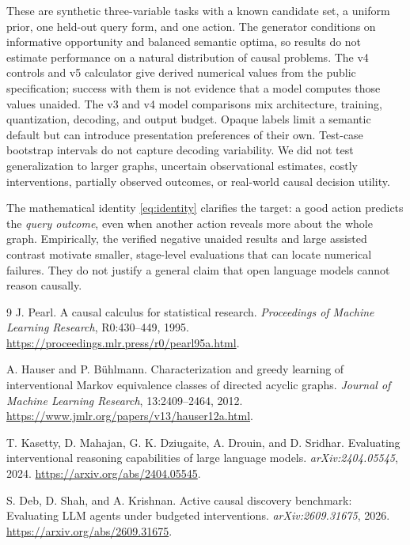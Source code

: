 \documentclass[10pt]{article}
\begin{document}
These are synthetic three-variable tasks with a known candidate set, a uniform prior, one held-out query form, and one action. The generator conditions on informative opportunity and balanced semantic optima, so results do not estimate performance on a natural distribution of causal problems. The v4 controls and v5 calculator give derived numerical values from the public specification; success with them is not evidence that a model computes those values unaided. The v3 and v4 model comparisons mix architecture, training, quantization, decoding, and output budget. Opaque labels limit a semantic default but can introduce presentation preferences of their own. Test-case bootstrap intervals do not capture decoding variability. We did not test generalization to larger graphs, uncertain observational estimates, costly interventions, partially observed outcomes, or real-world causal decision utility.

The mathematical identity \eqref{eq:identity} clarifies the target: a good action predicts the \emph{query outcome}, even when another action reveals more about the whole graph. Empirically, the verified negative unaided results and large assisted contrast motivate smaller, stage-level evaluations that can locate numerical failures. They do not justify a general claim that open language models cannot reason causally.

\begin{thebibliography}{9}
J. Pearl.
\newblock A causal calculus for statistical research.
\newblock \emph{Proceedings of Machine Learning Research}, R0:430--449, 1995.
\newblock \url{https://proceedings.mlr.press/r0/pearl95a.html}.

A. Hauser and P. B\"uhlmann.
\newblock Characterization and greedy learning of interventional Markov equivalence classes of directed acyclic graphs.
\newblock \emph{Journal of Machine Learning Research}, 13:2409--2464, 2012.
\newblock \url{https://www.jmlr.org/papers/v13/hauser12a.html}.

T. Kasetty, D. Mahajan, G. K. Dziugaite, A. Drouin, and D. Sridhar.
\newblock Evaluating interventional reasoning capabilities of large language models.
\newblock \emph{arXiv:2404.05545}, 2024.
\newblock \url{https://arxiv.org/abs/2404.05545}.

S. Deb, D. Shah, and A. Krishnan.
\newblock Active causal discovery benchmark: Evaluating LLM agents under budgeted interventions.
\newblock \emph{arXiv:2609.31675}, 2026.
\newblock \url{https://arxiv.org/abs/2609.31675}.
\end{thebibliography}
\end{document}
